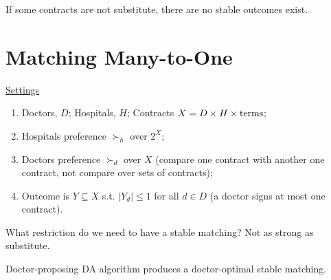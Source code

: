 \documentclass[11pt]{elegantbook}
\begin{document}


If some contracts are not substitute, there are no stable outcomes exist.

\section{Matching Many-to-One}
\underline{Settings}
\begin{enumerate}[$\circ$]
    \item Doctors, $D$; Hospitals, $H$; Contracts $X=D\times H\times \textnormal{terms}$;
    \item Hospitals preference $\succ_h$ over $2^X$;
    \item Doctors preference $\succ_d$ over $X$ (compare one contract with another one contract, not compare over sets of contracts);
    \item Outcome is $Y\subseteq X$ s.t. $|Y_d|\leq 1$ for all $d\in D$ (a doctor signs at most one contract).
\end{enumerate}

What restriction do we need to have a stable matching? Not as strong as substitute.

\begin{corollary}
    Doctor-proposing DA algorithm produces a doctor-optimal stable matching.
\end{corollary}
\end{document}
